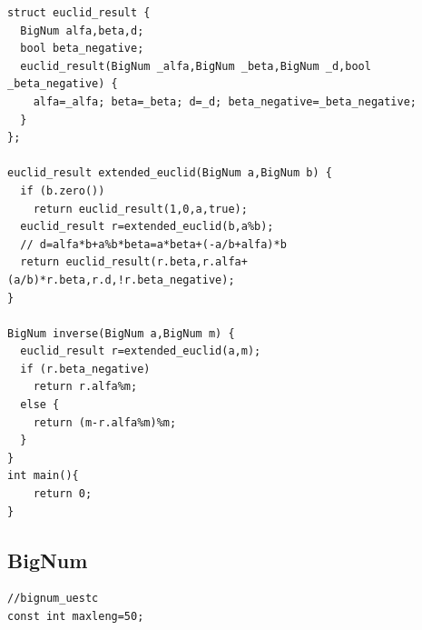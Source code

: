 \documentclass[twocolumn]{article}
\begin{document}
\begin{twocolumn}
\begin{lstlisting}[language={[ANSI]C}]
struct euclid_result {
  BigNum alfa,beta,d;
  bool beta_negative;
  euclid_result(BigNum _alfa,BigNum _beta,BigNum _d,bool _beta_negative) {
    alfa=_alfa; beta=_beta; d=_d; beta_negative=_beta_negative;
  }
};

euclid_result extended_euclid(BigNum a,BigNum b) {
  if (b.zero())
    return euclid_result(1,0,a,true);
  euclid_result r=extended_euclid(b,a%b);
  // d=alfa*b+a%b*beta=a*beta+(-a/b+alfa)*b
  return euclid_result(r.beta,r.alfa+(a/b)*r.beta,r.d,!r.beta_negative);
}

BigNum inverse(BigNum a,BigNum m) {
  euclid_result r=extended_euclid(a,m);
  if (r.beta_negative)
    return r.alfa%m;
  else {
    return (m-r.alfa%m)%m;
  }
}
int main(){
    return 0;
}
\end{lstlisting}

\subsection{BigNum}
\begin{lstlisting}[language={[ANSI]C}]
//bignum_uestc
const int maxleng=50;


\end{lstlisting}
\end{twocolumn}
\end{document}
